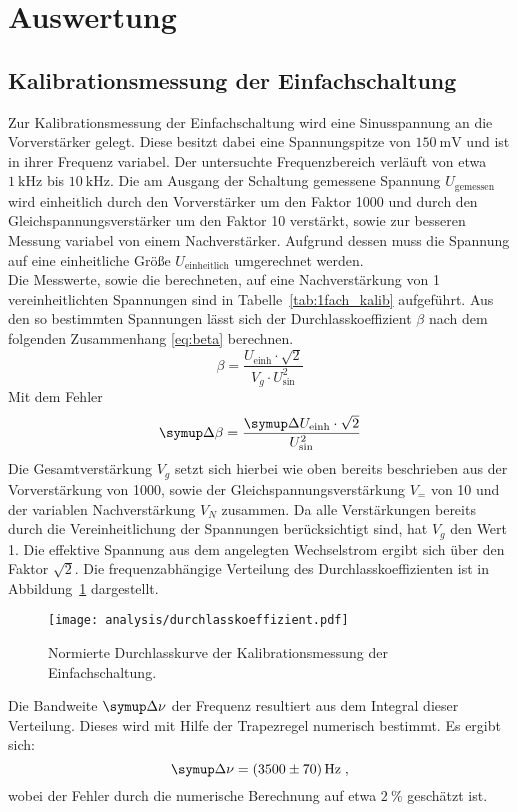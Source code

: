 \section{Auswertung}
\label{sec:auswertung}
%

%
\subsection{Kalibrationsmessung der Einfachschaltung}
%
Zur Kalibrationsmessung der Einfachschaltung wird eine Sinusspannung an die
Vorverstärker gelegt. Diese besitzt dabei eine Spannungspitze von
$\SI{150}{\milli\volt}$ und ist in ihrer Frequenz variabel. Der untersuchte
Frequenzbereich verläuft von etwa $\SI{1}{\kilo\hertz}$ bis
$\SI{10}{\kilo\hertz}$. Die am Ausgang der Schaltung gemessene Spannung
$U_\text{gemessen}$ wird einheitlich durch den Vorverstärker um den Faktor
\num{1000} und durch den Gleichspannungsverstärker um den Faktor \num{10}
verstärkt, sowie zur besseren Messung variabel von einem Nachverstärker.
Aufgrund dessen muss die Spannung auf eine einheitliche Größe $U_\text{einheitlich}$
umgerechnet werden.\\
%
Die Messwerte, sowie die berechneten, auf eine Nachverstärkung von \num{1}
vereinheitlichten Spannungen sind in Tabelle~\ref{tab:1fach_kalib} aufgeführt.
Aus den so bestimmten Spannungen lässt sich der Durchlasskoeffizient $\beta$
nach dem folgenden Zusammenhang \eqref{eq:beta} berechnen.
%
\begin{equation}
  \beta= \frac{U_\text{einh} \cdot \sqrt{2}}{V_g \cdot U_\text{sin}^2}
  \label{eq:beta}
\end{equation}
%
Mit dem Fehler
%
\begin{equation}
  \upD\beta=\frac{\upD U_\text{einh}\cdot\sqrt{2}}{U^2_\text{sin}}
\end{equation}
%
Die Gesamtverstärkung $V_g$ setzt sich hierbei wie oben bereits beschrieben aus
der Vorverstärkung von \num{1000}, sowie der Gleichspannungsverstärkung $V_{=}$ von
\num{10} und der variablen Nachverstärkung $V_N$ zusammen. Da alle Verstärkungen bereits
durch die Vereinheitlichung der Spannungen berücksichtigt sind, hat $V_g$ den Wert
\num{1}. Die effektive Spannung aus dem angelegten Wechselstrom ergibt sich über den Faktor $\sqrt{2}$.
Die frequenzabhängige Verteilung des Durchlasskoeffizienten ist in
Abbildung~\ref{fig:beta} dargestellt.
%
\begin{figure}
  \centering
  \texttt{[image: analysis/durchlasskoeffizient.pdf]}
  \caption{Normierte Durchlasskurve der Kalibrationsmessung der Einfachschaltung.}
  \label{fig:beta}
\end{figure}
%
Die Bandweite $\upD\nu$ der Frequenz resultiert aus dem Integral dieser
Verteilung. Dieses wird mit Hilfe der Trapezregel numerisch bestimmt. Es ergibt
sich:
%
\begin{equation}
  \upD\nu=\SI{3500(70)}{\hertz}\; ,
\end{equation}
%
wobei der Fehler durch die numerische Berechnung auf etwa $\SI{2}{\percent}$ geschätzt ist.

